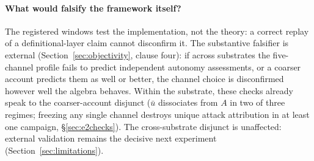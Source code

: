 \paragraph{What would falsify the framework itself?}
The registered windows test the implementation, not the theory: a correct
replay of a definitional-layer claim cannot disconfirm it. The substantive
falsifier is external (Section~\ref{sec:objectivity}, clause four): if across
substrates the five-channel profile fails to predict independent autonomy
assessments, or a coarser account predicts them as well or better, the channel
choice is disconfirmed however well the algebra behaves. Within the substrate,
these checks already speak to the coarser-account disjunct ($\bar u$
dissociates from $A$ in two of three regimes; freezing any single channel
destroys unique attack attribution in at least one campaign,
\S\ref{sec:e2checks}). The cross-substrate disjunct is unaffected: external
validation remains the decisive next experiment
(Section~\ref{sec:limitations}).
